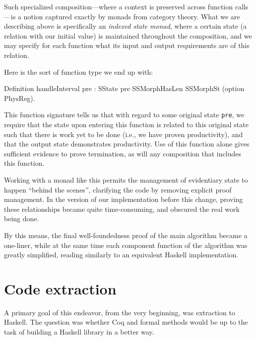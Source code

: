 \documentclass{llncs}
\begin{document}
Such specialized composition---where a context is preserved across function
calls---is a notion captured exactly by monads from category theory.  What we
are describing above is specifically an \emph{indexed state monad}, where a
certain state (a relation with our initial value) is maintained throughout the
composition, and we may specify for each function what its input and output
requirements are of this relation.

Here is the sort of function type we end up with:

\begin{MyCoqExampleStar}
Definition handleInterval {pre}
  : SState pre SSMorphHasLen SSMorphSt (option PhysReg).
\end{MyCoqExampleStar}

This function signature tells us that with regard to some original state
\texttt{pre}, we require that the state upon entering this function is related
to this original state such that there is work yet to be done (i.e., we have
proven productivity), and that the output state demonstrates productivity.
Use of this function alone gives sufficient evidence to prove termination, as
will any composition that includes this function.

Working with a monad like this permits the management of evidentiary state to
happen ``behind the scenes'', clarifying the code by removing explicit proof
management.  In the version of our implementation before this change, proving
these relationships became quite time-consuming, and obscured the real work
being done.

By this means, the final well-foundedness proof of the main algorithm became a
one-liner, while at the same time each component function of the algorithm was
greatly simplified, reading similarly to an equivalent Haskell implementation.


\section{Code extraction}
\label{sec:extract}

A primary goal of this endeavor, from the very beginning, was extraction to
Haskell.  The question was whether Coq and formal methods would be up to the
task of building a Haskell library in a better way.
\end{document}
